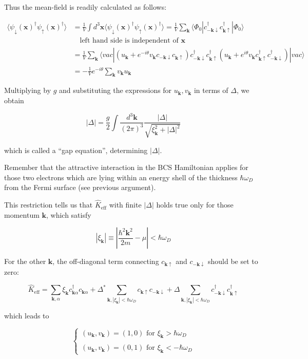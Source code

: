 Thus the mean-field is readily calculated as follows: 

\[\begin{split}
\langle\psi_{\downarrow}(\bm{x})^\dagger\psi_{\uparrow}(\bm{x})^\dagger\rangle &= \frac{1}{V}\int d^3 \bm{x} \langle\psi_{\downarrow}(\bm{x})^\dagger\psi_{\uparrow}(\bm{x})^\dagger\rangle = \frac{1}{V} \sum_{\bm{k}}\langle\Phi_0|c_{-\bm{k}\downarrow}^\dagger c_{\bm{k}\uparrow}^\dagger|\Phi_0\rangle \\
&\quad\text{left hand side is independent of }\bm{x}\\
&= \frac{1}{V}\sum_{\bm{k}}\langle vac|(u_{\bm{k}}+e^{-i\theta}v_{\bm{k}}c_{-\bm{k}\downarrow}c_{\bm{k}\uparrow})c_{-\bm{k}\downarrow}^\dagger c_{\bm{k}\uparrow}^\dagger (u_{\bm{k}}+e^{i\theta}v_{\bm{k}}c_{\bm{k}\uparrow}^\dagger c_{-\bm{k}\downarrow}^\dagger)|vac\rangle\\
&= -\frac{1}{V}e^{-i\theta}\sum_{\bm{k}}v_{\bm{k}}u_{\bm{k}}
\end{split}\]

Multiplying by $g$ and substituting the expressions for $u_{\bm{k}}, v_{\bm{k}}$ in terms of $\Delta$, we obtain

\[|\Delta| = \frac{g}{2}\int \frac{d^3 \bm{k}}{(2\pi)^3}\frac{|\Delta|}{\sqrt{\xi_{\bm{k}}^2+|\Delta|^2}} \]

which is called a ``gap equation'', determining $|\Delta|$. 

Remember that the attractive interaction in the BCS Hamiltonian applies for those two electrons which are lying within an energy shell of the thickness $\hbar \omega_D$ from the Fermi surface (see previous argument).

This restriction tells us that $\hat{K}_{\text{eff}}$ with finite $|\Delta|$ holds true only for those momentum $\bm{k}$, which satisfy

\[|\xi_{\bm{k}}| \equiv |\frac{\hbar^2 \bm{k}^2}{2m}-\mu|<\hbar \omega_D \]

For the other $\bm{k}$, the off-diagonal term connecting $c_{\bm{k}\uparrow}$ and $c_{-\bm{k}\downarrow}$ should be set to zero:

\[\hat{K}_{\text{eff}}=\sum_{\bm{k},\alpha}\xi_{\bm{k}}c_{\bm{k}\alpha}^\dagger c_{\bm{k}\alpha}+\Delta^* \sum_{\bm{k},|\xi_{\bm{k}}|<\hbar\omega_D}c_{\bm{k}\uparrow}c_{-\bm{k}\downarrow}+\Delta\sum_{\bm{k},|\xi_{\bm{k}}|<\hbar\omega_D}c_{-\bm{k}\downarrow}^\dagger c_{\bm{k}\uparrow}^\dagger \]

which leads to

\[\begin{cases}
 (u_{\bm{k}},v_{\bm{k}}) = (1,0)\text{ for }\xi_{\bm{k}}>\hbar\omega_D\\
\ \\
(u_{\bm{k}},v_{\bm{k}}) = (0,1)\text{ for }\xi_{\bm{k}}<-\hbar\omega_D
\end{cases}\]

